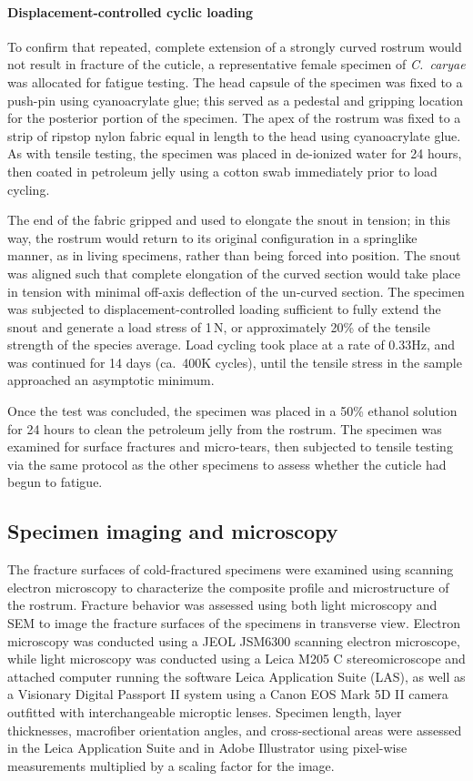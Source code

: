 \documentclass[twocolumn, linenumbers, superscriptaddress, nofootinbib]{revtex4-1}
\begin{document}
			\paragraph*{Displacement-controlled cyclic loading}
				To confirm that repeated, complete extension of a strongly curved rostrum would not result in fracture of the cuticle, a representative female specimen of \textit{C.~caryae} was allocated for fatigue testing.
				The head capsule of the specimen was fixed to a push-pin using cyanoacrylate glue; this served as a pedestal and gripping location for the posterior portion of the specimen.
				The apex of the rostrum was fixed to a strip of ripstop nylon fabric equal in length to the head using cyanoacrylate glue.
				As with tensile testing, the specimen was placed in de-ionized water for 24 hours, then coated in petroleum jelly using a cotton swab immediately prior to load cycling.
				
				The end of the fabric gripped and used to elongate the snout in tension; in this way, the rostrum would return to its original configuration in a springlike manner, as in living specimens, rather than being forced into position.
				The snout was aligned such that complete elongation of the curved section would take place in tension with minimal off-axis deflection of the un-curved section.
				The specimen was subjected to displacement-controlled loading sufficient to fully extend the snout and generate a load stress of 1\,N, or approximately 20\% of the tensile strength of the species average.
				Load cycling took place at a rate of 0.33Hz, and was continued for 14 days (ca.~400K cycles), until the tensile stress in the sample approached an asymptotic minimum.
				
				Once the test was concluded, the specimen was placed in a 50\% ethanol solution for 24 hours to clean the petroleum jelly from the rostrum.
				The specimen was examined for surface fractures and micro-tears, then subjected to tensile testing via the same protocol as the other specimens to assess whether the cuticle had begun to fatigue.
		
		\subsection*{Specimen imaging and microscopy}
			The fracture surfaces of cold-fractured specimens were examined using scanning electron microscopy to characterize the composite profile and microstructure of the rostrum.
			Fracture behavior was assessed using both light microscopy and SEM to image the fracture surfaces of the specimens in transverse view.
			Electron microscopy was conducted using a JEOL JSM6300 scanning electron microscope, while light microscopy was conducted using a Leica M205 C stereomicroscope and attached	computer running the software Leica Application Suite (LAS), as well as a Visionary Digital Passport II system using a Canon EOS Mark 5D II camera outfitted with interchangeable microptic lenses.
			Specimen length, layer thicknesses, macrofiber orientation angles, and cross-sectional areas were assessed in the Leica Application Suite and in Adobe Illustrator using pixel-wise measurements multiplied by a scaling factor for the image.
			
\end{document}
